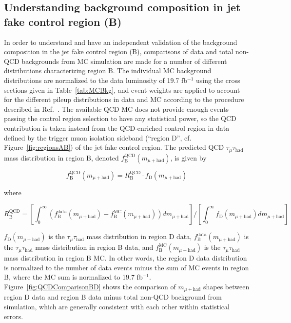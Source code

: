 \subsection{Understanding background composition in jet fake control region (B)\label{sec:bkgs-regB-data-MC}}

In order to understand and have an independent validation of the background composition in the jet fake control region (B), comparisons of data and total non-QCD backgrounds from MC simulation are made for a number of different distributions characterizing region B.  The individual MC background distributions are normalized to the data luminosity of 19.7 fb$^{-1}$ using the cross sections given in Table~\ref{tab:MCBkg}, and event weights are applied to account for the different pileup distributions in data and MC according to the procedure described in Ref.~\cite{PU-Twiki}.  The available QCD MC does not provide enough events passing the control region selection to have any statistical power, so the QCD contribution is taken instead from the QCD-enriched control region in data defined by the trigger muon isolation sideband (``region D'', cf. Figure~\ref{fig:regionsAB}) of the jet fake control region.  The predicted QCD $\tau_{\mu}\tau_{\text{had}}$ mass distribution in region B, denoted $f_{\text{B}}^{\text{QCD}}(m_{\mu+\text{had}})$, is given by

\begin{equation}
\label{eq:f-B-QCD}
f_{\text{B}}^{\text{QCD}}(m_{\mu+\text{had}}) = R_{\text{B}}^{\text{QCD}}\cdot f_{\text{D}}(m_{\mu+\text{had}})
\end{equation}

where

\begin{equation}
\label{eq:R-B-QCD}
R_{\text{B}}^{\text{QCD}} = [\int_{0}^{\infty}(f_{\text{B}}^{\text{data}}(m_{\mu+\text{had}}) - f_{\text{B}}^{\text{MC}}(m_{\mu+\text{had}}))dm_{\mu+\text{had}}]/[\int_{0}^{\infty}f_{\text{D}}(m_{\mu+\text{had}})dm_{\mu+\text{had}}]
\end{equation}

$f_{\text{D}}(m_{\mu+\text{had}})$ is the $\tau_{\mu}\tau_{\text{had}}$ mass distribution in region D data, $f_{\text{B}}^{\text{data}}(m_{\mu+\text{had}})$ is the $\tau_{\mu}\tau_{\text{had}}$ mass distribution in region B data, and $f_{\text{B}}^{\text{MC}}(m_{\mu+\text{had}})$ is the $\tau_{\mu}\tau_{\text{had}}$ mass distribution in region B MC.  In other words, the region D data distribution is normalized to the number of data events minus the sum of MC events in region B, where the MC sum is normalized to 19.7 fb$^{-1}$.  Figure~\ref{fig:QCDComparisonBD} shows the comparison of $m_{\mu+{\text{had}}}$ shapes between region D data and region B data minus total non-QCD background from simulation, which are generally consistent with each other within statistical errors.

